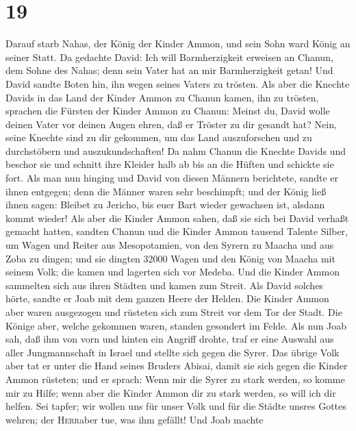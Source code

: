 \hypertarget{section-18}{%
\section{19}\label{section-18}}

 Darauf starb Nahas, der König der Kinder Ammon, und sein
Sohn ward König an seiner Statt.  Da gedachte David: Ich
will Barmherzigkeit erweisen an Chanun, dem Sohne des Nahas; denn sein
Vater hat an mir Barmherzigkeit getan! Und David sandte Boten hin, ihn
wegen seines Vaters zu trösten. Als aber die Knechte Davids in das Land
der Kinder Ammon zu Chanun kamen, ihn zu trösten, 
sprachen die Fürsten der Kinder Ammon zu Chanun: Meinst du, David wolle
deinen Vater vor deinen Augen ehren, daß er Tröster zu dir gesandt hat?
Nein, seine Knechte sind zu dir gekommen, um das Land auszuforschen und
zu durchstöbern und auszukundschaften!  Da nahm Chanun die
Knechte Davids und beschor sie und schnitt ihre Kleider halb ab bis an
die Hüften und schickte sie fort.  Als man nun hinging und
David von diesen Männern berichtete, sandte er ihnen entgegen; denn die
Männer waren sehr beschimpft; und der König ließ ihnen sagen: Bleibet zu
Jericho, bis euer Bart wieder gewachsen ist, alsdann kommt wieder!
 Als aber die Kinder Ammon sahen, daß sie sich bei David
verhaßt gemacht hatten, sandten Chanun und die Kinder Ammon tausend
Talente Silber, um Wagen und Reiter aus Mesopotamien, von den Syrern zu
Maacha und aus Zoba zu dingen;  und sie dingten 32000
Wagen und den König von Maacha mit seinem Volk; die kamen und lagerten
sich vor Medeba. Und die Kinder Ammon sammelten sich aus ihren Städten
und kamen zum Streit.  Als David solches hörte, sandte er
Joab mit dem ganzen Heere der Helden.  Die Kinder Ammon
aber waren ausgezogen und rüsteten sich zum Streit vor dem Tor der
Stadt. Die Könige aber, welche gekommen waren, standen gesondert im
Felde.  Als nun Joab sah, daß ihm von vorn und hinten ein
Angriff drohte, traf er eine Auswahl aus aller Jungmannschaft in Israel
und stellte sich gegen die Syrer.  Das übrige Volk aber
tat er unter die Hand seines Bruders Abisai, damit sie sich gegen die
Kinder Ammon rüsteten;  und er sprach: Wenn mir die Syrer
zu stark werden, so komme mir zu Hilfe; wenn aber die Kinder Ammon dir
zu stark werden, so will ich dir helfen.  Sei tapfer; wir
wollen uns für unser Volk und für die Städte unsres Gottes wehren; der
\textsc{Herr}aber tue, was ihm gefällt!  Und Joab machte
